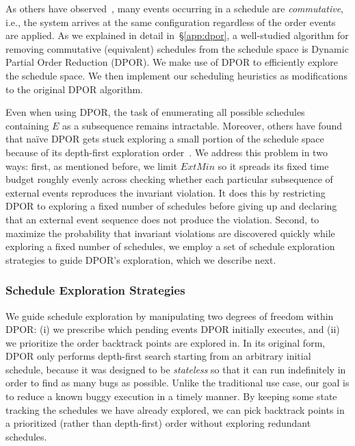 As others have observed~\cite{godefroid1995partial}, many events occurring in a schedule are {\em commutative}, i.e., the system arrives at the same
configuration regardless of the order events are applied. As we explained in
detail in~\S\ref{app:dpor}, a well-studied algorithm for removing commutative
(equivalent) schedules from the schedule space is Dynamic Partial Order
Reduction (DPOR). We make use of DPOR to efficiently explore the schedule
space. We then implement our scheduling heuristics as modifications to the original
DPOR algorithm.

Even when using DPOR, the task of enumerating all possible schedules containing $E$ as a
subsequence remains intractable. Moreover, others have found that na\"ive DPOR
gets stuck exploring a small portion of the schedule space because of its
depth-first exploration order~\cite{lin2009modist}.
We address this problem in two ways: first, as mentioned before, we limit
$ExtMin$ so it spreads its fixed time budget roughly evenly across
checking whether each particular subsequence of external events reproduces the invariant violation. It does this by
restricting DPOR to exploring a fixed number of schedules before
giving up and declaring that an external event sequence does not produce the violation. Second, to maximize the probability that
invariant violations are discovered quickly while exploring a fixed number of
schedules, we employ a set of schedule exploration strategies to guide
DPOR's exploration, which we describe next.

\subsubsection{Schedule Exploration Strategies}
\label{subsec:exploration_strategies}

We guide schedule exploration by manipulating two degrees of freedom within
DPOR: (i) we prescribe which pending events DPOR initially
executes, and (ii) we prioritize the order backtrack points are explored in.
In its original form, DPOR only performs
depth-first search starting from an arbitrary initial schedule, because it was designed to be {\em
stateless} so that it can run indefinitely in order to find as
many bugs as possible. Unlike the traditional use case, our goal is to reduce
a known buggy execution in a
timely manner. By keeping some state tracking the schedules we have already explored, we can pick
backtrack points in a prioritized (rather than depth-first) order without exploring redundant schedules.

